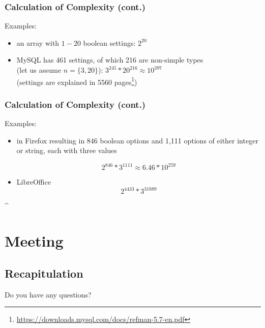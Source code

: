 \begin{frame}
	\frametitle{Calculation of Complexity (cont.)}

	Examples:
	\begin{itemize}
	\item an array with $1-20$ boolean settings:
	\pause
	$2^{20}$

	\item MySQL has 461 settings, of which 216 are non-simple types~\cite{xu2015hey} \\ (let us assume $n=\{3,20\}$):
	\pause
	$3^{245} * 20^{216} \approx 10^{397}$ \\
	(settings are explained in 5560 pages\footnote{\url{https://downloads.mysql.com/docs/refman-5.7-en.pdf}})
	\end{itemize}
\end{frame}

\begin{frame}
	\frametitle{Calculation of Complexity (cont.)~\cite{jin2014configurations}}

	Examples:
	\begin{itemize}
	\item in Firefox resulting in 846 boolean options and 1,111 options of either integer or string, each with three values

	\pause
	$$2^{846}*3^{1111} \approx 6.46 * 10^{259}$$

	\item LibreOffice
	\pause
	$$2^{4433} * 3^{31889}$$
	\end{itemize}
\end{frame}
\lstMakeShortInline[postbreak=,keywordstyle={},showspaces=no]^




\section{Meeting}

\subsection{Recapitulation}

\begin{frame}
	\begin{task}
	Do you have any questions?
	\end{task}
\end{frame}

